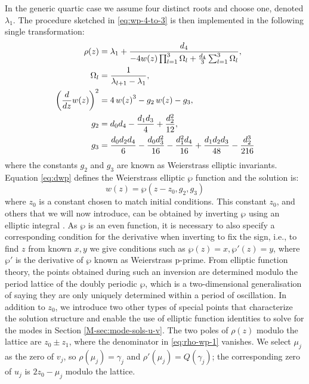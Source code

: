 \documentclass[11pt,a4paper]{article}
\begin{document}
In the generic quartic case we assume four distinct roots and choose one, denoted $\lambda_1$.
The procedure sketched in \eqref{eq:wp-4-to-3} is then implemented in the following single transformation:
\begin{align}
\rho{\left(z \right)} &= {\lambda}_{1} + \frac{d_4}{- 4 w{\left(z \right)} \prod_{l=1}^{3} {\Omega}_{l}  + \frac{d_4}{3} \sum_{l=1}^{3} {\Omega}_{l} }, \label{eq:rho-wp-1} \\
\Omega_l &= \frac{1}{\lambda_{l+1} - \lambda_1}, \notag \\
\left(\frac{d}{d z} w{\left(z \right)}\right)^{2} &= 4\,w{\left(z \right)}^3 - g_2\,w{\left(z \right)} - g_3, \label{eq:dwp} \\
g_{2} &= {d}_{0} {d}_{4} - \frac{{d}_{1} {d}_{3}}{4} + \frac{{d}_{2}^{2}}{12}, \label{eq:g2-d} \\
g_{3} &= \frac{{d}_{0} {d}_{2} {d}_{4}}{6} - \frac{{d}_{0} {d}_{3}^{2}}{16} - \frac{{d}_{1}^{2} {d}_{4}}{16} + \frac{{d}_{1} {d}_{2} {d}_{3}}{48} - \frac{{d}_{2}^{3}}{216} \label{eq:3-d}
\end{align}
where the constants $g_2$ and $g_3$ are known as Weierstrass elliptic invariants.
Equation \eqref{eq:dwp} defines the Weierstrass elliptic $\wp$ function and the solution is:
\begin{equation}
w(z) = \wp (z - z_0, g_2, g_3)
\end{equation}
where $z_0$ is a constant chosen to match initial conditions.
This constant $z_0$, and others that we will now introduce, can be obtained by inverting $\wp$ using an elliptic integral \cite{whittakerCourseModernAnalysis2021}.
As $\wp$ is an even function, it is necessary to also specify a corresponding condition for the derivative when inverting to fix the sign, i.e., to find $z$ from known $x,y$ we give conditions such as $\wp\left(z\right)=x, \wp'\left(z\right)=y$, where $\wp'$ is the derivative of $\wp$ known as Weierstrass p-prime.
From elliptic function theory, the points obtained during such an inversion are determined modulo the period lattice of the doubly periodic $\wp$, which is a two-dimensional generalisation of saying they are only uniquely determined within a period of oscillation.
In addition to $z_0$, we introduce two other types of special points that characterize the solution structure and enable the use of elliptic function identities to solve for the modes in Section \ref*{M-sec:mode-sols-u-v}.
The two poles of $\rho(z)$ modulo the lattice are $z_0\pm z_1$, where the denominator in \eqref{eq:rho-wp-1} vanishes.
We select $\mu_j$ as the zero of $v_j$, so $\rho(\mu_j)=\gamma_j$ and $\rho'(\mu_j)=Q(\gamma_j)$; the corresponding zero of $u_j$ is $2z_0-\mu_j$ modulo the lattice.
\end{document}
